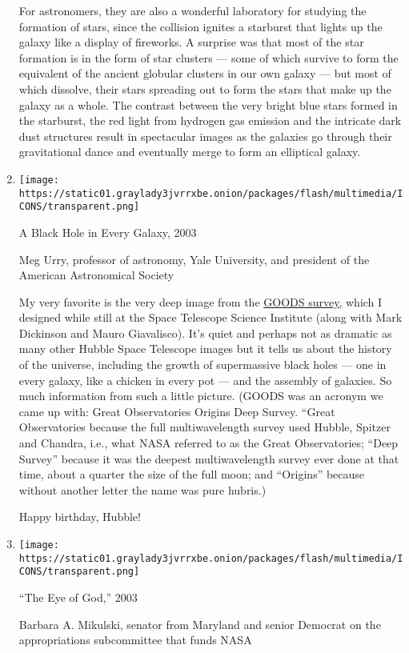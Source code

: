 \begin{enumerate}
  For astronomers, they are also a wonderful laboratory for studying the
  formation of stars, since the collision ignites a starburst that
  lights up the galaxy like a display of fireworks. A surprise was that
  most of the star formation is in the form of star clusters --- some of
  which survive to form the equivalent of the ancient globular clusters
  in our own galaxy --- but most of which dissolve, their stars
  spreading out to form the stars that make up the galaxy as a whole.
  The contrast between the very bright blue stars formed in the
  starburst, the red light from hydrogen gas emission and the intricate
  dark dust structures result in spectacular images as the galaxies go
  through their gravitational dance and eventually merge to form an
  elliptical galaxy.
\item
  \texttt{[image: https://static01.graylady3jvrrxbe.onion/packages/flash/multimedia/ICONS/transparent.png]}

  A Black Hole in Every Galaxy, 2003

  Meg Urry, professor of astronomy, Yale University, and president of
  the American Astronomical Society

  My very favorite is the very deep image from the
  \href{http://www.stsci.edu/science/goods/)\%20}{GOODS survey,} which I
  designed while still at the Space Telescope Science Institute (along
  with Mark Dickinson and Mauro Giavalisco). It's quiet and perhaps not
  as dramatic as many other Hubble Space Telescope images but it tells
  us about the history of the universe, including the growth of
  supermassive black holes --- one in every galaxy, like a chicken in
  every pot --- and the assembly of galaxies. So much information from
  such a little picture. (GOODS was an acronym we came up with: Great
  Observatories Origins Deep Survey. ``Great Observatories because the
  full multiwavelength survey used Hubble, Spitzer and Chandra, i.e.,
  what NASA referred to as the Great Observatories; ``Deep Survey''
  because it was the deepest multiwavelength survey ever done at that
  time, about a quarter the size of the full moon; and ``Origins''
  because without another letter the name was pure hubris.)

  Happy birthday, Hubble!
\item
  \texttt{[image: https://static01.graylady3jvrrxbe.onion/packages/flash/multimedia/ICONS/transparent.png]}

  ``The Eye of God,'' 2003

  Barbara A. Mikulski, senator from Maryland and senior Democrat on the
  appropriations subcommittee that funds NASA


\end{enumerate}
